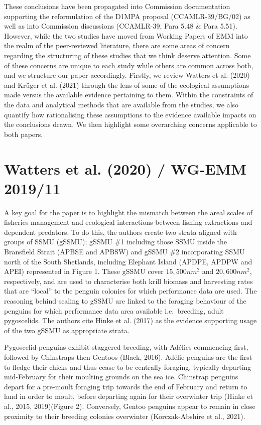 \documentclass[]{elsarticle} %
\begin{document}
These conclusions have been propagated into Commission documentation
supporting the reformulation of the D1MPA proposal (CCAMLR-39/BG/02) as
well as into Commission discussions (CCAMLR-39, Para 5.48 \& Para 5.51).
However, while the two studies have moved from Working Papers of EMM
into the realm of the peer-reviewed literature, there are some areas of
concern regarding the structuring of these studies that we think deserve
attention. Some of these concerns are unique to each study while others
are common across both, and we structure our paper accordingly. Firstly,
we review Watters et al. (2020) and Krüger et al. (2021) through the
lens of some of the ecological assumptions made versus the available
evidence pertaining to them. Within the constraints of the data and
analytical methods that are available from the studies, we also quantify
how rationalising these assumptions to the evidence available impacts on
the conclusions drawn. We then highlight some overarching concerns
applicable to both papers.

\hypertarget{watters2020-wg-emm-201911}{%
\section{Watters et al. (2020) / WG-EMM
2019/11}\label{watters2020-wg-emm-201911}}

A key goal for the paper is to highlight the mismatch between the areal
scales of fisheries management and ecological interactions between
fishing extractions and dependent predators. To do this, the authors
create two strata aligned with groups of SSMU (gSSMU); gSSMU \#1
including those SSMU inside the Bransfield Strait (APBSE and APBSW) and
gSSMU \#2 incorporating SSMU north of the South Shetlands, including
Elephant Island (APDPE, APDPW and APEI) represented in Figure 1. These
gSSMU cover \(15,500nm^2\) and \(20,600nm^2\), respectively, and are
used to characterise both krill biomass and harvesting rates that are
``local'' to the penguin colonies for which performance data are used.
The reasoning behind scaling to gSSMU are linked to the foraging
behaviour of the penguins for which performance data area available
i.e.~breeding, adult pygoscelids. The authors cite Hinke et al. (2017)
as the evidence supporting usage of the two gSSMU as appropriate strata.

Pygoscelid penguins exhibit staggered breeding, with Adélies commencing
first, followed by Chinstraps then Gentoos (Black, 2016). Adélie
penguins are the first to fledge their chicks and thus cease to be
centrally foraging, typically departing mid-February for their moulting
grounds on the sea ice. Chinstrap penguins depart for a pre-moult
foraging trip towards the end of February and return to land in order to
moult, before departing again for their overwinter trip (Hinke et al.,
2015, 2019)(Figure 2). Conversely, Gentoo penguins appear to remain in
close proximity to their breeding colonies overwinter (Korczak-Abshire
et al., 2021).
\end{document}
